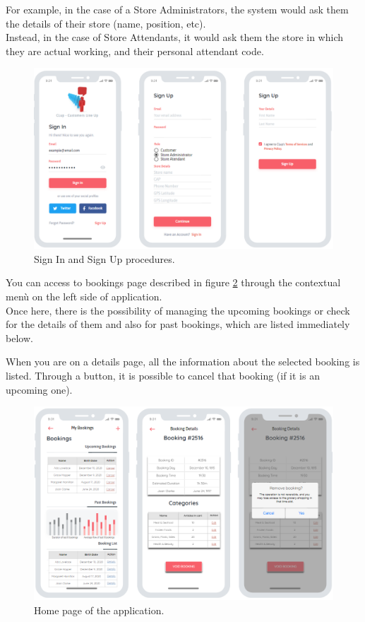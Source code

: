 \documentclass[table, 12pt]{article}
\begin{document}
For example, in the case of a Store Administrators, the system would ask them the details of their store (name, position, etc).\\
Instead, in the case of Store Attendants, it would ask them the store in which they are actual working, and their personal attendant code.
\begin{figure}[H]
    \begin{center}
        \includegraphics[width=\textwidth]{assets/mock_sign_in_sign_up.png}
        \caption{Sign In and Sign Up procedures.}
        \label{mock_sign_in_up}
    \end{center}
\end{figure}

You can access to bookings page described in figure \ref{mock_bookings} through the contextual menù on the left side of application.\\
Once here, there is the possibility of managing the upcoming bookings or check for the details of them and also for past bookings, which are listed immediately below.

When you are on a details page, all the information about the selected booking is listed. Through a button, it is possible to cancel that booking (if it is an upcoming one).

\begin{figure}[H]
    \begin{center}
        \includegraphics[width=\textwidth]{assets/mock_bookings.png}
        \caption{Home page of the application.}
        \label{mock_bookings}
    \end{center}
\end{figure}
\end{document}
